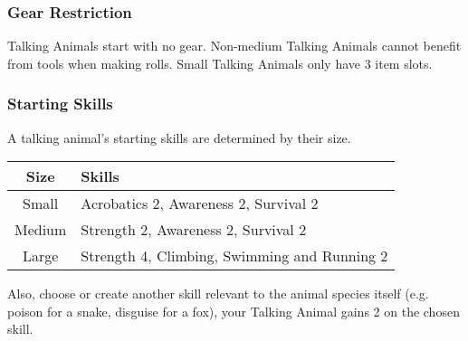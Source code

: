 \begin{multicols}{2}
    \subsubsection*{Gear Restriction}
    Talking Animals start with no gear. Non-medium Talking Animals cannot benefit from tools when making rolls. Small Talking Animals only have 3 item slots.
 
    \subsubsection*{Starting Skills}
    A talking animal's starting skills are determined by their size.
    
    \begin{adjustbox}{width=\columnwidth,center}
    \begin{tabular}{|c|l|}
    \hline
    \textbf{Size} & \textbf{Skills} \\
    \hline
    Small & Acrobatics 2, Awareness 2, Survival 2 \\
    Medium & Strength 2, Awareness 2, Survival 2 \\
    Large & Strength 4, Climbing, Swimming and Running 2\\
    \hline
    \end{tabular}
    \end{adjustbox}

    Also, choose or create another skill relevant to the animal species itself (e.g. poison for a snake, disguise for a fox), your Talking Animal gains 2 on the chosen skill.
\end{multicols}

